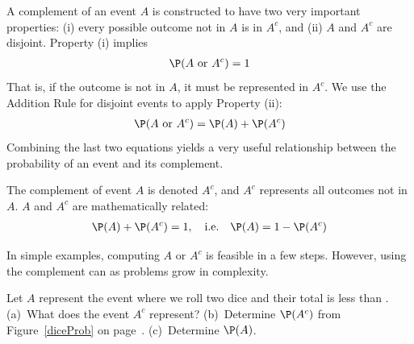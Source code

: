 \documentclass{ccg-topic}
\begin{document}
A complement of an event $A$ is constructed to have two very important properties: (i) every possible outcome not in $A$ is in $A^c$, and (ii) $A$ and $A^c$ are disjoint. Property (i) implies
\begin{align*}
\P(A\text{ or }A^c) = 1
\end{align*}
That is, if the outcome is not in $A$, it must be represented in $A^c$. We use the Addition Rule for disjoint events to apply Property (ii):
\begin{align*}
\P(A\text{ or }A^c) = \P(A) + \P(A^c)
\end{align*}
Combining the last two equations yields a very useful
relationship between the probability of an event and
its complement.

\begin{defn}[Complement]
  The complement of event $A$ is denoted $A^c$, and $A^c$
  represents all outcomes not in~$A$. $A$ and $A^c$ are
  mathematically related:
  \begin{align*}
  \P(A) + \P(A^c) = 1, \quad\text{i.e.}\quad \P(A) = 1-\P(A^c)
  \end{align*}
\end{defn}

In simple examples, computing $A$ or $A^c$ is feasible in a few steps. However, using the complement can  as problems grow in complexity.

\begin{todo}
Let $A$ represent the event where we roll two dice and their total is less than . (a)~What does the event $A^c$ represent? (b)~Determine $\P(A^c)$ from Figure~\ref{diceProb} on page~\pageref{diceProb}. (c)~Determine $\P(A)$.\footnotemark
\end{todo}
\end{document}
